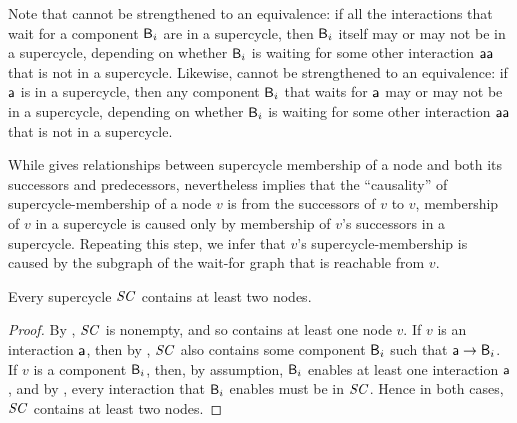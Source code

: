Note that  cannot be strengthened to an equivalence: if all
the interactions that wait for a component $\mathsf{B}_i$ are in a supercycle, then $\mathsf{B}_i$ itself may or may
not be in a supercycle, depending on whether $\mathsf{B}_i$ is waiting for some other interaction $\mathsf{aa}$ that is not in a
supercycle.
%
Likewise,  cannot be strengthened to an equivalence: if $\mathsf{a}$
is in a supercycle, then any component $\mathsf{B}_i$ that waits for $\mathsf{a}$ may or may not be in a 
supercycle, depending on whether $\mathsf{B}_i$ is waiting for some other interaction $\mathsf{aa}$ that is not in a supercycle. 

While  gives relationships between supercycle membership of a node and both its
successors and predecessors, nevertheless  implies that the ``causality'' of
supercycle-membership of a node $v$ is from the successors of $v$ to $v$, \ie membership of $v$ in a
supercycle is caused only by membership of $v$'s successors in a supercycle. Repeating this step, we
infer that $v$'s supercycle-membership is caused by the subgraph of the wait-for graph that is
reachable from $v$.







\begin{proposition} \label{prop:supercycle:contains-twoNodes}
Every supercycle $\mathit{SC}$ contains at least two nodes.
\end{proposition} 

\begin{proof}
By , $\mathit{SC}$ is nonempty, and so contains at least one node $v$.
If $v$ is an interaction $\mathsf{a}$, then by , $\mathit{SC}$ also contains some component $\mathsf{B}_i$ such that 
$\mathsf{a} \rightarrow \mathsf{B}_i$. 
If $v$ is a  component $\mathsf{B}_i$, then, by assumption, $\mathsf{B}_i$ enables at least one interaction $\mathsf{a}$, and by 
, every interaction that $\mathsf{B}_i$ enables must be in $\mathit{SC}$.
Hence in both cases, $\mathit{SC}$ contains at least two nodes.
\end{proof}





